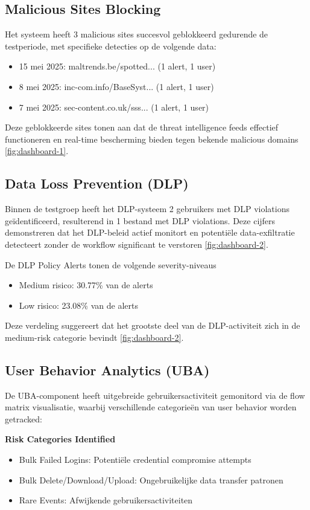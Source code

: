 \subsection{Malicious Sites Blocking}
Het systeem heeft 3 malicious sites succesvol geblokkeerd gedurende de testperiode, met specifieke detecties op de volgende data:
\begin{itemize}
    \item 15 mei 2025: maltrends.be/spotted... (1 alert, 1 user)
    \item 8 mei 2025: inc-com.info/BaseSyst... (1 alert, 1 user)
    \item 7 mei 2025: sec-content.co.uk/sss... (1 alert, 1 user)
\end{itemize}
Deze geblokkeerde sites tonen aan dat de threat intelligence feeds effectief functioneren en real-time bescherming bieden tegen bekende malicious domains \ref{fig:dashboard-1}.

\subsection{Data Loss Prevention (DLP)}
Binnen de testgroep heeft het DLP-systeem 2 gebruikers met DLP violations geïdentificeerd, resulterend in 1 bestand met DLP violations. Deze cijfers demonstreren dat het DLP-beleid actief monitort en potentiële data-exfiltratie detecteert zonder de workflow significant te verstoren \ref{fig:dashboard-2}.

\vspace{2ex}

De DLP Policy Alerts tonen de volgende severity-niveaus
\begin{itemize}
    \item Medium risico: 30.77\% van de alerts
    \item Low risico: 23.08\% van de alerts
\end{itemize}
Deze verdeling suggereert dat het grootste deel van de DLP-activiteit zich in de medium-risk categorie bevindt \ref{fig:dashboard-2}.

\subsection{User Behavior Analytics (UBA)}
De UBA-component heeft uitgebreide gebruikersactiviteit gemonitord via de flow matrix visualisatie, waarbij verschillende categorieën van user behavior worden getracked:

\textbf{Risk Categories Identified}
\begin{itemize}
    \item Bulk Failed Logins: Potentiële credential compromise attempts
    \item Bulk Delete/Download/Upload: Ongebruikelijke data transfer patronen
    \item Rare Events: Afwijkende gebruikersactiviteiten
\end{itemize}

